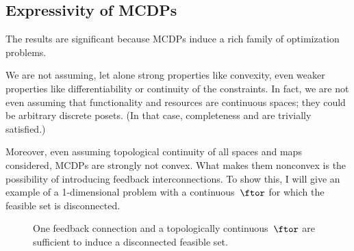 \subsection{Expressivity of MCDPs}

The results are significant because MCDPs induce a rich family of
optimization problems.

We are not assuming, let alone strong properties like convexity, even
weaker properties like differentiability or continuity of the constraints.
In fact, we are not even assuming that functionality and resources
are continuous spaces; they could be arbitrary discrete posets. (In
that case, completeness and \scottcontinuity are trivially satisfied.)

Moreover, even assuming topological continuity of all spaces and maps
considered, MCDPs are strongly not convex. What makes them nonconvex
is the possibility of introducing feedback interconnections. To show
this, I will give an example of a 1-dimensional problem with a continuous~$\ftor$
for which the feasible set is disconnected.

\begin{figure}[h]
  \hfill
  \hfill
  \hfill
  \caption{One feedback connection and a topologically continuous~$\ftor$
    are sufficient to induce a disconnected feasible set.}
  \label{fig:ceil-1}
\end{figure}

\medskip{}

